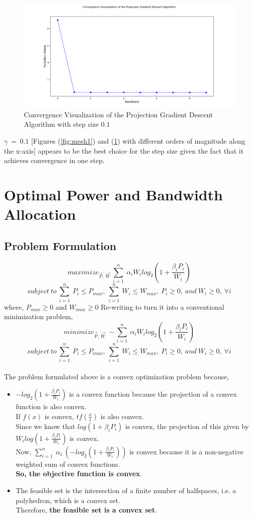 \documentclass[12pt, draftcls, onecolumn]{IEEEtran}
\begin{document}
\begin{figure}[t]
\includegraphics[width=1.0\textwidth]{PGD_Convergence_Gamma_Optimal_Point1.png}
\caption{Convergence Visualization of the Projection Gradient Descent Algorithm with step size $0.1$}
\label{fig:mesh7}
\centering
\end{figure}
$\gamma\ =\ 0.1$ [Figures (\ref{fig:mesh1}) and (\ref{fig:mesh7}) with different orders of magnitude along the x-axis] appears to be the best choice for the step size given the fact that it achieves convergence in one step.
\clearpage
\section{Optimal Power and Bandwidth Allocation}
\subsection{Problem Formulation}
\[maximize_{\vec{P},\ \vec{W}}\ \sum_{i=1}^n\ \alpha_i W_i log_2(1 + \frac{\beta_i P_i}{W_i})\]
\[subject\ to\ \sum_{i=1}^n\ P_i \leq P_{max},\ \sum_{i=1}^n\ W_i \leq W_{max},\ P_i \geq 0,\ and\ W_i \geq 0,\ \forall i\]
where, $P_{max} \geq 0$ and $W_{max} \geq 0$
Re-writing to turn it into a conventional minimization problem,
\[minimize_{\vec{P},\ \vec{W}}\ -\sum_{i=1}^n\ \alpha_i W_i log_2(1 + \frac{\beta_i P_i}{W_i})\]
\[subject\ to\ \sum_{i=1}^n\ P_i \leq P_{max},\ \sum_{i=1}^n\ W_i \leq W_{max},\ P_i \geq 0,\ and\ W_i \geq 0,\ \forall i\]
\\The problem formulated above is a convex optimization problem because,
\begin{itemize}
    \item $-log_2(1 + \frac{\beta_i P_i}{W_i})$ is a convex function because the projection of a convex function is also convex.
    \\If $f(x)$ is convex, $tf(\frac{x}{t})$ is also convex.
    \\Since we know that $log(1 + \beta_i P_i)$ is convex, the projection of this given by $W_i log(1 + \frac{\beta_i P_i}{W_i})$ is convex.
    \\Now, $\sum_{i=1}^n\ \alpha_i\ (-log_2(1 + \frac{\beta_i P_i}{W_i}))$ is convex because it is a non-negative weighted sum of convex functions.
    \\\textbf{So, the objective function is convex}.
    \item The feasible set is the intersection of a finite number of halfspaces, i.e. a polyhedron, which is a convex set.
    \\Therefore, \textbf{the feasible set is a convex set}.
\end{itemize}
\end{document}
